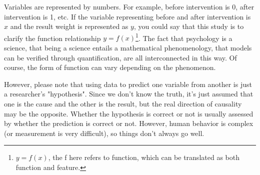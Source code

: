 \documentclass{ltjsbook}
\begin{document}
Variables are represented by numbers. For example, before intervention is 0, after intervention is 1, etc. If the variable representing before and after intervention is $x$ and the result weight is represented as $y$, you could say that this study is to clarify the function relationship $y=f(x)$\footnote{$y=f(x)$, the f here refers to function, which can be translated as both function and feature.}. The fact that psychology is a science, that being a science entails a mathematical phenomenology, that models can be verified through quantification, are all interconnected in this way. Of course, the form of function can vary depending on the phenomenon.

However, please note that using data to predict one variable from another is just a researcher's "hypothesis". Since we don't know the truth, it's just assumed that one is the cause and the other is the result, but the real direction of causality may be the opposite. Whether the hypothesis is correct or not is usually assessed by whether the prediction is correct or not. However, human behavior is complex (or measurement is very difficult), so things don't always go well.
\end{document}
